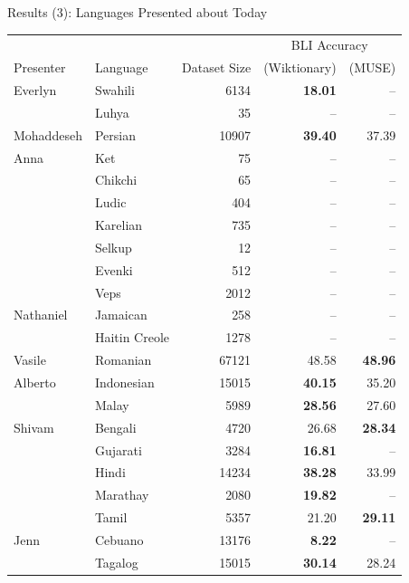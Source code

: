 \documentclass{beamer}
\begin{document}
\begin{frame}{Results (3): Languages Presented about Today}
    \tiny
    \centering
    \begin{tabular}{llrrr}
        \toprule
        & & & \multicolumn{2}{c}{BLI Accuracy} \\
        \cmidrule{4-5}
        Presenter & Language & Dataset Size & (Wiktionary)& (MUSE) \\
        \midrule
        Everlyn & Swahili           & 6134 & \textbf{18.01} & --\\
                & Luhya             & 35  & -- & --\\
        \midrule
        Mohaddeseh & Persian           & 10907 & \textbf{39.40} & 37.39 \\
        \midrule
        Anna & Ket & 75  & -- & --\\
             & Chikchi & 65  & -- & --\\
             & Ludic & 404  & -- & --\\
             & Karelian & 735  & -- & --\\
             & Selkup & 12  & -- & --\\
             & Evenki & 512  & -- & --\\
             & Veps & 2012  & -- & --\\
         \midrule
            Nathaniel & Jamaican          & 258   & -- & --\\
                      & Haitin Creole     & 1278   & -- & --\\
                      \midrule
                      Vasile & Romanian & 67121 & 48.58 & \textbf{48.96} \\
                      \midrule
                      Alberto & Indonesian & 15015 & \textbf{40.15} & 35.20 \\
                      & Malay & 5989 & \textbf{28.56} & 27.60 \\
                      \midrule
            Shivam  & Bengali & 4720 & 26.68 & \textbf{28.34} \\
                    & Gujarati & 3284 & \textbf{16.81} & -- \\
                    & Hindi & 14234 & \textbf{38.28} & 33.99 \\
                    & Marathay & 2080 & \textbf{19.82} & -- \\
                    & Tamil & 5357 & 21.20 & \textbf{29.11} \\
                      \midrule
            Jenn      & Cebuano & 13176 & \textbf{8.22} & -- \\
                      & Tagalog & 15015 & \textbf{30.14} & 28.24 \\
        \bottomrule
    \end{tabular}
%
\end{frame}
\end{document}
